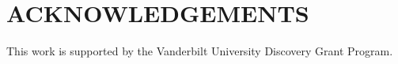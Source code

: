 \documentclass[]{spie}  %
\newcommand{\xxx}[1]{ \textcolor{red}{#1} }
\begin{document}
\section{ACKNOWLEDGEMENTS}
This work is supported by the Vanderbilt University Discovery Grant Program.

\end{document}
